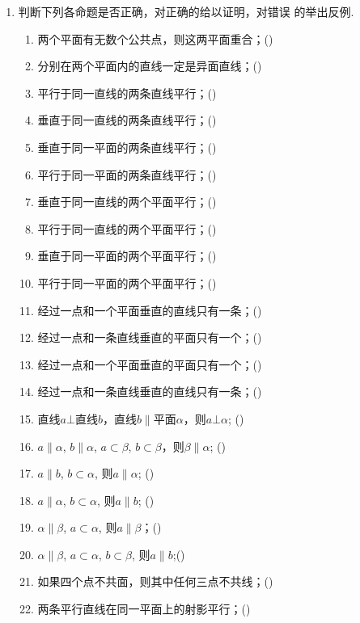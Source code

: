 \begin{enumerate}
    \item 判断下列各命题是否正确，对正确的给以证明，对错误
    的举出反例.
\begin{enumerate}[(1)]
\item 两个平面有无数个公共点，则这两平面重合；\hfill (\quad )
\item 分别在两个平面内的直线一定是异面直线；\hfill (\quad )
\item 平行于同一直线的两条直线平行；\hfill (\quad )
\item 垂直于同一直线的两条直线平行；\hfill (\quad )
\item 垂直于同一平面的两条直线平行；\hfill (\quad )
\item 平行于同一平面的两条直线平行；\hfill (\quad )
\item 垂直于同一直线的两个平面平行；\hfill (\quad )
\item 平行于同一直线的两个平面平行；\hfill (\quad )
\item 垂直于同一平面的两个平面平行；\hfill (\quad )
\item 平行于同一平面的两个平面平行；\hfill (\quad )
\item 经过一点和一个平面垂直的直线只有一条；\hfill (\quad )
    \item 经过一点和一条直线垂直的平面只有一个；\hfill (\quad )
    \item 经过一点和一个平面垂直的平面只有一个；\hfill (\quad )
    \item 经过一点和一条直线垂直的直线只有一条；\hfill (\quad )
    \item 直线$a\bot$直线$b$，直线$b\parallel $平面$\alpha$，则$a\bot\alpha$; \hfill (\quad )
    \item $a\parallel \alpha$, $b\parallel \alpha$, $a\subset \beta$, $b\subset \beta$，则$\beta\parallel \alpha$; \hfill (\quad )
    \item $a\parallel b$, $b\subset \alpha$, 则$a\parallel \alpha$; \hfill (\quad )
    \item $a\parallel \alpha$, $b\subset \alpha$, 则$a\parallel b$; \hfill (\quad )
        \item $\alpha\parallel \beta$, $a\subset \alpha$, 则$a\parallel \beta$；\hfill (\quad )
            \item $\alpha\parallel \beta$, $a\subset \alpha$, $b\subset \beta$, 则$a\parallel b$;\hfill (\quad )
    \item 如果四个点不共面，则其中任何三点不共线；\hfill (\quad )
    \item 两条平行直线在同一平面上的射影平行；\hfill (\quad )

\end{enumerate}
\end{enumerate}
